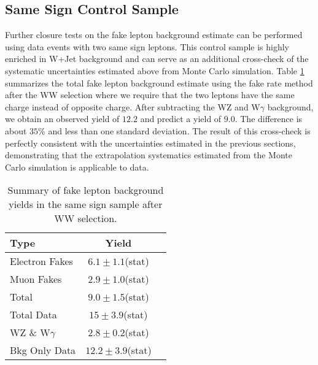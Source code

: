 \subsection{Same Sign Control Sample}
\label{sec:FakeLeptonBkgSameSignControlSample}
Further closure tests on the fake lepton background estimate can be performed using data events
with two same sign leptons. This control sample is highly enriched in W+Jet background and 
can serve as an additional cross-check of the systematic uncertainties estimated above from 
Monte Carlo simulation. Table \ref{tab:FakeLeptonBkgPrediction_SameSignSample} summarizes the 
total fake lepton background estimate using the fake rate method after the WW selection 
where we require that the two leptons have the same charge instead of opposite charge. After
subtracting the WZ and W$\gamma$ background, we obtain an observed yield of $12.2$ and 
predict a yield of $9.0$. The difference is about $35\%$ and less than one standard deviation.
The result of this cross-check is perfectly consistent with the uncertainties 
estimated in the previous sections, demonstrating that the extrapolation systematics
estimated from the Monte Carlo simulation is applicable to data.


\begin{table}[!htbp]
\begin{center}
\begin{tabular}{|l|c|c|}
\hline
Type           & Yield \\
\hline
Electron Fakes          &  $6.1 \pm 1.1$(stat)   \\
Muon Fakes              &  $2.9 \pm 1.0$(stat)   \\
Total                   &  $9.0 \pm 1.5$(stat)   \\
\hline
Total Data              &  $15  \pm 3.9$(stat)   \\
WZ \& W$\gamma$         &  $2.8 \pm 0.2$(stat)   \\
Bkg Only Data           &  $12.2 \pm 3.9$(stat)   \\

\hline
\end{tabular}
\caption{Summary of fake lepton background yields in the same sign sample after WW selection. }
\label{tab:FakeLeptonBkgPrediction_SameSignSample}
\end{center}
\end{table}
